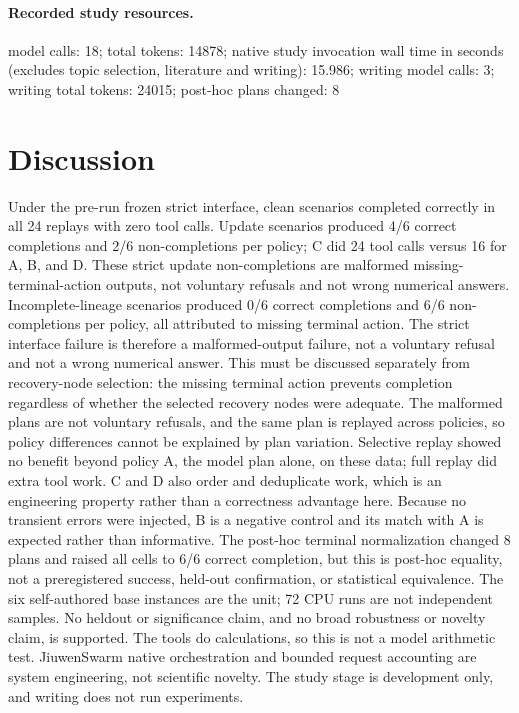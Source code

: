 \documentclass{article}
\begin{document}
\paragraph{Recorded study resources.}model calls: 18; total tokens: 14878; native study invocation wall time in seconds (excludes topic selection, literature and writing): 15.986; writing model calls: 3; writing total tokens: 24015; post-hoc plans changed: 8

\section{Discussion}

Under the pre-run frozen strict interface, clean scenarios completed correctly in all 24 replays with zero tool calls. Update scenarios produced 4/6 correct completions and 2/6 non-completions per policy; C did 24 tool calls versus 16 for A, B, and D. These strict update non-completions are malformed missing-terminal-action outputs, not voluntary refusals and not wrong numerical answers. Incomplete-lineage scenarios produced 0/6 correct completions and 6/6 non-completions per policy, all attributed to missing terminal action. The strict interface failure is therefore a malformed-output failure, not a voluntary refusal and not a wrong numerical answer. This must be discussed separately from recovery-node selection: the missing terminal action prevents completion regardless of whether the selected recovery nodes were adequate. The malformed plans are not voluntary refusals, and the same plan is replayed across policies, so policy differences cannot be explained by plan variation. Selective replay showed no benefit beyond policy A, the model plan alone, on these data; full replay did extra tool work. C and D also order and deduplicate work, which is an engineering property rather than a correctness advantage here. Because no transient errors were injected, B is a negative control and its match with A is expected rather than informative. The post-hoc terminal normalization changed 8 plans and raised all cells to 6/6 correct completion, but this is post-hoc equality, not a preregistered success, held-out confirmation, or statistical equivalence. The six self-authored base instances are the unit; 72 CPU runs are not independent samples. No heldout or significance claim, and no broad robustness or novelty claim, is supported. The tools do calculations, so this is not a model arithmetic test. JiuwenSwarm native orchestration and bounded request accounting are system engineering, not scientific novelty. The study stage is development only, and writing does not run experiments.
\end{document}
